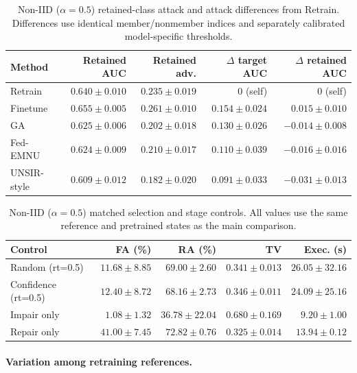 \documentclass[software,article,submit,moreauthors]{Definitions/mdpi}
\begin{document}
\begin{table}[H]\centering\small
\caption{Non-IID ($\alpha=0.5$) retained-class attack and attack differences from Retrain. Differences use identical member/nonmember indices and separately calibrated model-specific thresholds.}
\label{tab:noniid-attack}
\begin{tabular}{lrrrr}\toprule Method & Retained AUC & Retained adv. & $\Delta$ target AUC & $\Delta$ retained AUC\\\midrule
Retrain & $0.640 \pm 0.010$ & $0.235 \pm 0.019$ & 0 (self) & 0 (self)\\
Finetune & $0.655 \pm 0.005$ & $0.261 \pm 0.010$ & $0.154 \pm 0.024$ & $0.015 \pm 0.010$\\
GA & $0.625 \pm 0.006$ & $0.202 \pm 0.018$ & $0.130 \pm 0.026$ & $-0.014 \pm 0.008$\\
Fed-EMNU & $0.624 \pm 0.009$ & $0.210 \pm 0.017$ & $0.110 \pm 0.039$ & $-0.016 \pm 0.016$\\
UNSIR-style & $0.609 \pm 0.012$ & $0.182 \pm 0.020$ & $0.091 \pm 0.033$ & $-0.031 \pm 0.013$\\
\bottomrule\end{tabular}\end{table}

\begin{table}[H]\centering\small
\caption{Non-IID ($\alpha=0.5$) matched selection and stage controls. All values use the same reference and pretrained states as the main comparison.}
\label{tab:noniid-controls}
\begin{tabular}{lrrrr}\toprule Control & FA (\%) & RA (\%) & TV & Exec. (s)\\\midrule
Random (rt=0.5) & $11.68 \pm 8.85$ & $69.00 \pm 2.60$ & $0.341 \pm 0.013$ & $26.05 \pm 32.16$\\
Confidence (rt=0.5) & $12.40 \pm 8.72$ & $68.16 \pm 2.73$ & $0.346 \pm 0.011$ & $24.09 \pm 25.16$\\
Impair only & $1.08 \pm 1.32$ & $36.78 \pm 22.04$ & $0.680 \pm 0.169$ & $9.20 \pm 1.00$\\
Repair only & $41.00 \pm 7.45$ & $72.82 \pm 0.76$ & $0.325 \pm 0.014$ & $13.94 \pm 0.12$\\
\bottomrule\end{tabular}\end{table}
\paragraph{Variation among retraining references.}
\end{document}
